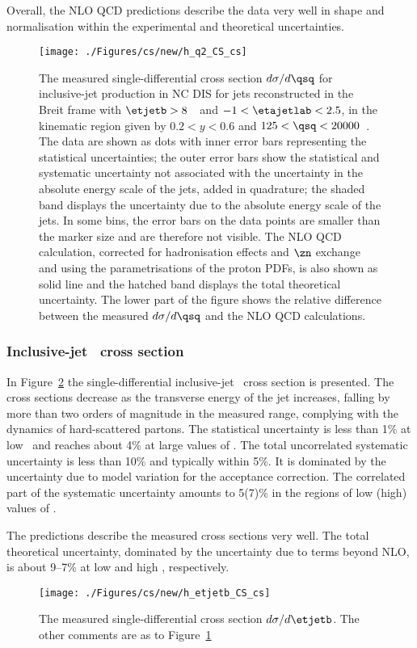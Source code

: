 Overall, the NLO QCD predictions describe the data very well in shape and normalisation within the experimental and theoretical uncertainties.
\begin{figure}[p]
	\centering
		\texttt{[image: ./Figures/cs/new/h\_q2\_CS\_cs]}
	\caption{The measured single-differential cross section $d\sigma/d\qsq$ for inclusive-jet production in NC DIS for jets reconstructed in the Breit frame with $\etjetb > 8$~\GeV~and $-1<\etajetlab<2.5$, in the kinematic region given by $0.2<y<0.6$ and $125 < \qsq < 20000$~\GeV. The data are shown as dots with inner error bars representing the statistical uncertainties; the outer error bars show the statistical and systematic uncertainty not associated with the uncertainty in the absolute energy scale of the jets, added in quadrature; the shaded band displays the uncertainty due to the absolute energy scale of the jets. In some bins, the error bars on the data points are smaller than the marker size and are therefore not visible. The NLO QCD calculation, corrected for hadronisation effects and $\zn$ exchange and using the  parametrisations of the proton PDFs, is also shown as solid line and the hatched band displays the total theoretical uncertainty. The lower part of the figure shows the relative difference between the measured $d\sigma/d\qsq$ and the NLO QCD calculations.} 
	\label{fig:inclusivesingledif_q2}
\end{figure}

\subsubsection*{Inclusive-jet \dsdetjetb~cross section}
In Figure~\ref{fig:inclusivesingledif_et} the single-differential inclusive-jet \dsdetjetb~cross section is presented. The cross sections decrease as the transverse energy of the jet increases, falling by more than two orders of magnitude in the measured range, complying with the dynamics of hard-scattered partons. The statistical uncertainty is less than 1\% at low \etjetb~and reaches about 4\% at large values of \etjetb. The total uncorrelated systematic uncertainty is less than 10\% and typically within 5\%. It is dominated by the uncertainty due to model variation for the acceptance correction. The correlated part of the systematic uncertainty amounts to 5(7)\%  in the regions of low (high) values of \etjetb.

The predictions describe the measured cross sections very well. The total theoretical uncertainty, dominated by the uncertainty due to terms beyond NLO, is about 9--7\% at low and high \etjetb, respectively. 
\begin{figure}[p]
	\centering
		\texttt{[image: ./Figures/cs/new/h\_etjetb\_CS\_cs]}
	\caption{The measured single-differential cross section $d\sigma/d\etjetb$. The other comments are as to Figure~\ref{fig:inclusivesingledif_q2}}
	\label{fig:inclusivesingledif_et}
\end{figure}

